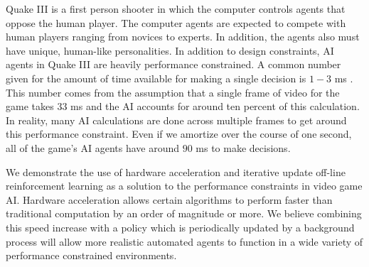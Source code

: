 Quake III is a first person shooter in which the computer controls agents that oppose the human player. The computer agents are expected to compete with human players ranging from novices to experts. In addition, the agents also must have unique, human-like personalities. In addition to design constraints, AI agents in Quake III are heavily performance constrained. A common number given for the amount of time available for making a single decision is $1-3$ ms \cite{game:ai:lecture}. This number comes from the assumption that a single frame of video for the game takes $33$ ms and the AI accounts for around ten percent of this calculation. In reality, many AI calculations are done across multiple frames to get around this performance constraint. Even if we amortize over the course of one second, all of the game's AI agents have around $90$ ms to make decisions.

We demonstrate the use of hardware acceleration and iterative update off-line reinforcement learning as a solution to the performance constraints in video game AI. Hardware acceleration allows certain algorithms to perform faster than traditional computation by an order of magnitude or more. We believe combining this speed increase with a policy which is periodically updated by a background process will allow more realistic automated agents to function in a wide variety of performance constrained environments.